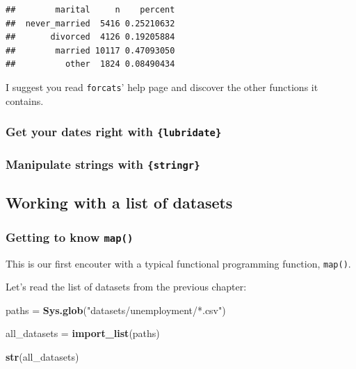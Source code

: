 \documentclass[]{gitbook}
\newenvironment{Shaded}{\begin{snugshade}}{\end{snugshade}}
\newcommand{\KeywordTok}[1]{\textcolor[rgb]{0.13,0.29,0.53}{\textbf{#1}}}
\newcommand{\NormalTok}[1]{#1}
\newcommand{\StringTok}[1]{\textcolor[rgb]{0.31,0.60,0.02}{#1}}
\theoremstyle{definition}
\theoremstyle{definition}
\theoremstyle{definition}
\theoremstyle{remark}
\begin{document}
\begin{verbatim}
##        marital     n    percent
##  never_married  5416 0.25210632
##       divorced  4126 0.19205884
##        married 10117 0.47093050
##          other  1824 0.08490434
\end{verbatim}

I suggest you read \texttt{forcats}' help page and discover the other
functions it contains.

\hypertarget{get-your-dates-right-with-lubridate}{%
\subsubsection{\texorpdfstring{Get your dates right with
\texttt{\{lubridate\}}}{Get your dates right with \{lubridate\}}}\label{get-your-dates-right-with-lubridate}}

\hypertarget{manipulate-strings-with-stringr}{%
\subsubsection{\texorpdfstring{Manipulate strings with
\texttt{\{stringr\}}}{Manipulate strings with \{stringr\}}}\label{manipulate-strings-with-stringr}}

\hypertarget{working-with-a-list-of-datasets}{%
\subsection{Working with a list of
datasets}\label{working-with-a-list-of-datasets}}

\hypertarget{getting-to-know-map}{%
\subsubsection{\texorpdfstring{Getting to know
\texttt{map()}}{Getting to know map()}}\label{getting-to-know-map}}

This is our first encouter with a typical functional programming
function, \texttt{map()}.

Let's read the list of datasets from the previous chapter:

\begin{Shaded}
\begin{Highlighting}[]
\NormalTok{paths =}\StringTok{ }\KeywordTok{Sys.glob}\NormalTok{(}\StringTok{"datasets/unemployment/*.csv"}\NormalTok{)}

\NormalTok{all_datasets =}\StringTok{ }\KeywordTok{import_list}\NormalTok{(paths)}

\KeywordTok{str}\NormalTok{(all_datasets)}
\end{Highlighting}
\end{Shaded}
\end{document}
